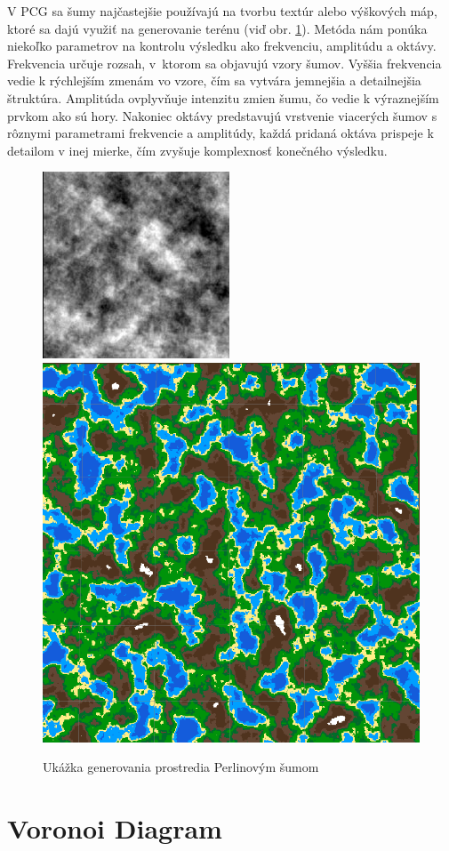 V PCG sa šumy najčastejšie používajú na tvorbu textúr alebo výškových máp, ktoré sa dajú využiť na generovanie terénu (viď obr. \ref{fig:perlin-noise}). Metóda nám ponúka niekoľko parametrov na kontrolu výsledku ako frekvenciu, amplitúdu a oktávy. Frekvencia určuje rozsah, v~ktorom sa objavujú vzory šumov. Vyššia frekvencia vedie k rýchlejším zmenám vo vzore, čím sa vytvára jemnejšia a detailnejšia štruktúra. Amplitúda ovplyvňuje intenzitu zmien šumu, čo vedie k výraznejším prvkom ako sú hory. Nakoniec oktávy predstavujú vrstvenie viacerých šumov s rôznymi parametrami frekvencie a amplitúdy, každá pridaná oktáva prispeje k detailom v inej mierke, čím zvyšuje komplexnosť konečného výsledku.

\begin{figure}[H]
    \centering
    \includegraphics[width=0.3\linewidth]{obrazky-figures/perlin-noise.jpg}
    \includegraphics[width=0.3\linewidth]{obrazky-figures/perlin-map.png}
    \caption{Ukážka generovania prostredia Perlinovým šumom\protect\footnotemark}
    \label{fig:perlin-noise}
\end{figure}


\section{Voronoi Diagram}


